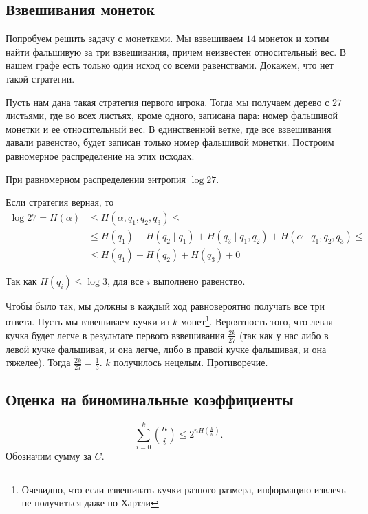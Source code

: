 \subsection{Взвешивания монеток}
Попробуем решить задачу с монетками. Мы взвешиваем $ 14$ монеток и хотим найти фальшивую за три взвешивания, причем неизвестен относительный вес. В нашем графе есть только один исход со всеми равенствами. Докажем, что нет такой стратегии.

Пусть нам дана такая стратегия первого игрока.
Тогда мы получаем дерево с $ 27$ листьями, где во всех листьях, кроме одного, записана пара:
номер фальшивой монетки и ее относительный вес.
В единственной ветке, где все взвешивания давали равенство, будет записан только номер фальшивой монетки.
Построим равномерное распределение на этих исходах.

При равномерном распределении энтропия $ \log 27$.

Если стратегия верная, то
\begin{align*}
\log 27 = H(\alpha) &\le  H( \alpha, q_1, q_2, q_3) \le \\ &\le H( q_1 ) + H(q_{2} \mid q_1 )+ H(q_3 \mid q_1, q_2)+ H( \alpha  \mid q_1, q_2, q_3 ) \le \tag{Chain rule}\\  
			& \le  H(q_1) + H(q_2) + H(q_3) + 0
\end{align*}

Так как $ H(q_i) \le  \log 3$, для все $ i$ выполнено равенство.

Чтобы было так, мы должны в каждый ход равновероятно получать все три ответа.
Пусть мы взвешиваем кучки из $ k$ монет\footnote{Очевидно, что если взвешивать кучки разного размера, информацию извлечь не получиться даже по Хартли}. 
Вероятность того, что левая кучка будет легче в результате первого взвешивания $\frac{2k}{27}$ (так как у нас либо в левой кучке фальшивая, и она легче, либо в правой кучке фальшивая, и она тяжелее). Тогда $\frac{2k}{27} = \frac{1}{3}$. $k$ получилось нецелым.
Противоречие.

\subsection{Оценка на биноминальные коэффициенты}
\[
	\sum_{i=0}^{k} {n \choose i} \le  2^{n H(\frac{k}{n})}
.\] 
Обозначим сумму за $ C$.

